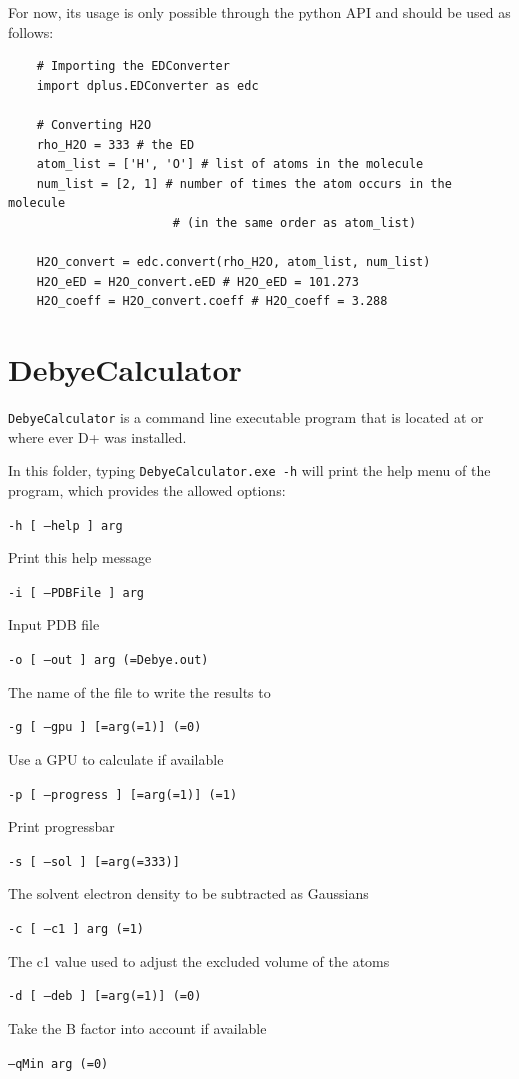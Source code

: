 \documentclass[../D+Manual.tex]{subfiles}
\begin{document}
For now, its usage is only possible through the python API and should be used as follows:
\begin{lstlisting}
	# Importing the EDConverter
	import dplus.EDConverter as edc
	
	# Converting H2O
	rho_H2O = 333 # the ED
	atom_list = ['H', 'O'] # list of atoms in the molecule
	num_list = [2, 1] # number of times the atom occurs in the molecule
					   # (in the same order as atom_list)
	
	H2O_convert = edc.convert(rho_H2O, atom_list, num_list)
	H2O_eED = H2O_convert.eED # H2O_eED = 101.273
	H2O_coeff = H2O_convert.coeff # H2O_coeff = 3.288	
\end{lstlisting}

\section{DebyeCalculator}


\texttt{DebyeCalculator} is a command line executable program that is located at  or where ever D+ was installed.
 
In this folder, typing \texttt{DebyeCalculator.exe -h} will print the help menu of the program, which provides the allowed options:

\texttt{-h [ --help ] arg} 

Print this help message

\texttt{-i [ --PDBFile ] arg}

Input PDB file

\texttt{-o [ --out ] arg (=Debye.out)}

The name of the file to write the results to

\texttt{-g [ --gpu ] [=arg(=1)] (=0)}

Use a GPU to calculate if available

\texttt{-p [ --progress ] [=arg(=1)] (=1)}

Print progressbar

\texttt{-s [ --sol ] [=arg(=333)]} 

The solvent electron density to be subtracted as Gaussians

\texttt{-c [ --c1 ] arg (=1)}

The c1 value used to adjust the excluded volume of the atoms

\texttt{-d [ --deb ] [=arg(=1)] (=0)} 

Take the B factor into account if available

\texttt{--qMin arg (=0)}
\end{document}
